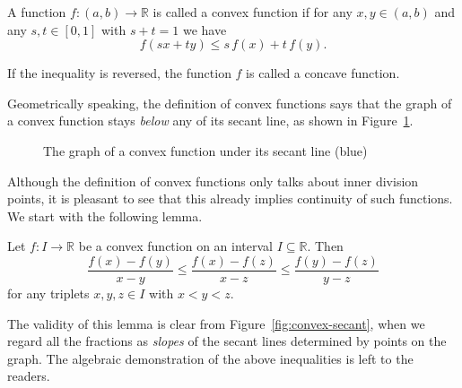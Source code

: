 \documentclass[11pt]{article}
\begin{document}
\begin{defn}
  A function $f: (a,b) \to \mathbb{R}$ is called a \textsf{convex function} if for any $x,y \in (a,b)$ and any $s, t \in [0,1]$ with $s + t = 1$ we have
  \[
    f(sx + ty) \leqslant s \, f(x) + t \, f(y).
  \]
  
  If the inequality is reversed, the function $f$ is called a \textsf{concave function}.
\end{defn}

Geometrically speaking, the definition of convex functions says that the graph of a convex function stays \textit{below} any of its secant line, as shown in Figure~\ref{fig:convex}.

\begin{figure}
  \centering
  \caption{The graph of a convex function under its secant line (blue)}
  \label{fig:convex}
\end{figure}

Although the definition of convex functions only talks about inner division points, it is pleasant to see that this already implies continuity of such functions.
We start with the following lemma.

\begin{lem}
  Let $f : I \to \mathbb{R}$ be a convex function on an interval $I \subseteq \mathbb{R}$.
  Then
  \[
    \frac{ f(x) - f(y) }{ x - y } \leqslant \frac{ f(x) - f(z) }{ x - z } \leqslant \frac{ f(y) - f(z) }{ y - z }
  \]
  for any triplets $x, y, z \in I$ with $x < y < z$.
\end{lem}

The validity of this lemma is clear from Figure~\ref{fig:convex-secant}, when we regard all the fractions as {\em slopes} of the secant lines determined by points on the graph.
The algebraic demonstration of the above inequalities is left to the readers.
\end{document}
